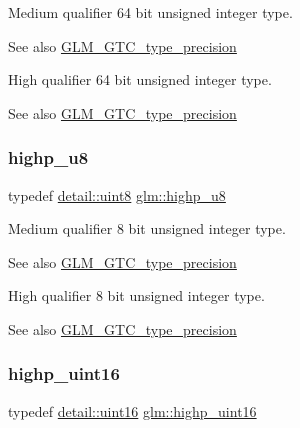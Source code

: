 Medium qualifier 64 bit unsigned integer type. \begin{DoxySeeAlso}{See also}
\mbox{\hyperlink{group__gtc__type__precision}{G\+L\+M\+\_\+\+G\+T\+C\+\_\+type\+\_\+precision}}
\end{DoxySeeAlso}
High qualifier 64 bit unsigned integer type. \begin{DoxySeeAlso}{See also}
\mbox{\hyperlink{group__gtc__type__precision}{G\+L\+M\+\_\+\+G\+T\+C\+\_\+type\+\_\+precision}} 
\end{DoxySeeAlso}
\mbox{\label{group__gtc__type__precision_ga8a60abe782749c504fb5ae51eb8b49cc}} 
\subsubsection{\texorpdfstring{highp\+\_\+u8}{highp\_u8}}
{\footnotesize\ttfamily typedef \mbox{\hyperlink{namespaceglm_1_1detail_aef2588f97d090cc19fbbe0c74fe17c8f}{detail\+::uint8}} \mbox{\hyperlink{group__gtc__type__precision_ga8a60abe782749c504fb5ae51eb8b49cc}{glm\+::highp\+\_\+u8}}}

Medium qualifier 8 bit unsigned integer type. \begin{DoxySeeAlso}{See also}
\mbox{\hyperlink{group__gtc__type__precision}{G\+L\+M\+\_\+\+G\+T\+C\+\_\+type\+\_\+precision}}
\end{DoxySeeAlso}
High qualifier 8 bit unsigned integer type. \begin{DoxySeeAlso}{See also}
\mbox{\hyperlink{group__gtc__type__precision}{G\+L\+M\+\_\+\+G\+T\+C\+\_\+type\+\_\+precision}} 
\end{DoxySeeAlso}
\mbox{\label{group__gtc__type__precision_ga4d32967d45ba8365e2a05eaaac85e978}} 
\subsubsection{\texorpdfstring{highp\+\_\+uint16}{highp\_uint16}}
{\footnotesize\ttfamily typedef \mbox{\hyperlink{namespaceglm_1_1detail_a47b2a7d006d187338e8031a352d1ce56}{detail\+::uint16}} \mbox{\hyperlink{group__gtc__type__precision_ga4d32967d45ba8365e2a05eaaac85e978}{glm\+::highp\+\_\+uint16}}}

